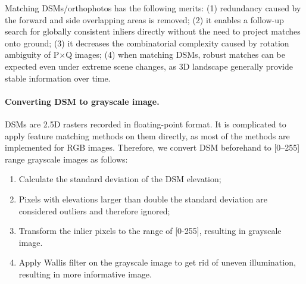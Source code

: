 %


\par
Matching \ac{DSM}s/orthophotos has the following merits: (1) redundancy caused by the forward and side overlapping areas is removed; (2) it enables a follow-up search for globally consistent inliers directly without the need to project matches onto ground; (3) it decreases the combinatorial complexity caused by rotation ambiguity of P$\times$Q images; (4) when matching \ac{DSM}s, robust matches can be expected even under extreme scene changes, as 3D landscape generally provide stable information over time.\\
\paragraph{Converting \ac{DSM} to grayscale image.} %
\ac{DSM}s are 2.5D rasters recorded in floating-point format. It is complicated to apply feature matching methods on them directly, as most of the methods are implemented for RGB images. Therefore, we convert \ac{DSM} beforehand to [0–255] range grayscale images as follows:\\
\begin{enumerate}
	\item Calculate the standard deviation of the \ac{DSM} elevation;
	\item Pixels with elevations larger than double the standard deviation are considered outliers and therefore ignored;
	\item Transform the inlier pixels to the range of [0-255], resulting in grayscale image.
	\item Apply Wallis filter on the grayscale image to get rid of uneven illumination, resulting in more informative image.
\end{enumerate}

